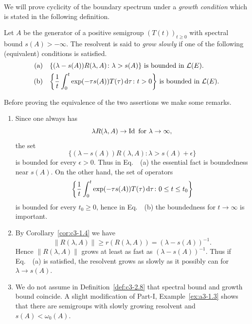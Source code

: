 We will prove cyclicity of the boundary spectrum under a \emph{growth condition}%
which is stated in the following definition.
\begin{definition}\label{def:c3-2.8}
	Let $A$ be the generator of a positive semigroup $(T(t))_{t \geq 0}$ with spectral bound $s(A) > -\infty$.
	The resolvent is said to \emph{grow slowly} if one of the following (equivalent) conditions is satisfied.
	\begin{equation}\label{eq:c3-2.15}
	\begin{split}
	\text{(a)}\quad & \text{$\{(\lambda-s(A))R(\lambda,A) \colon \lambda > s(A)\}$ is bounded in $\mathcal{L}(E)$} .\\
	\text{(b)}\quad & \text{$\left\{\frac{1}{t} \int_{0}^{t} \exp(-\tau s(A))T(\tau) \mathop{}\!\mathrm{d}{\tau} \colon t > 0\right\}$ is bounded in $\mathcal{L}(E)$} .
	\end{split}
	\end{equation}
\end{definition}
Before proving the equivalence of the two assertions we make some remarks.
\begin{remarks*}
\begin{enumerate}[\upshape (i), wide, labelindent=0.5em]
    \item 
    Since one always has 
\[
	\lambda R(\lambda,A) \to \operatorname{Id} \text{ for $\lambda \to \infty$,}
\]
%
the set 
%
\[
	\{(\lambda-s(A))R(\lambda,A) \colon \lambda > s(A)+\epsilon\}
\]
%
is bounded for every $\epsilon > 0$. 
Thus in Eq.~~(a) the essential fact is boundedness near $s(A)$. 
    On the other hand, the set of operators 
\[
	\mleft\{ \frac{1}{t} \int_{0}^{t} \exp(-\tau s(A))T(\tau) \diff{\tau} \colon 0 \leq t \leq t_{0} \mright\}
\]
%
is bounded for every $t_{0} \geq 0$, hence in Eq.~~(b) the boundedness for $t \to \infty$ is important.

    \item 
    By Corollary~\ref{cor:c3-1.4} we have 
\[
	\|R(\lambda,A)\| \geq r(R(\lambda,A)) = (\lambda-s(A))^{-1} .
\]
%
Hence $\|R(\lambda,A)\|$ grows at least as fast as $(\lambda-s(A))^{-1}$. 
    Thus if Eq.~~(a) is satisfied, the resolvent grows as slowly as it possibly can for $\lambda \to s(A)$.

    \item 
    We do not assume in Definition~\ref{def:c3-2.8} that spectral bound and growth bound coincide.
    A slight modification of Part-I, Example~\ref{ex:a3-1.3} shows that there are semigroups with slowly growing resolvent and $s(A) < \omega_0(A)$.
\end{enumerate}
\end{remarks*}
